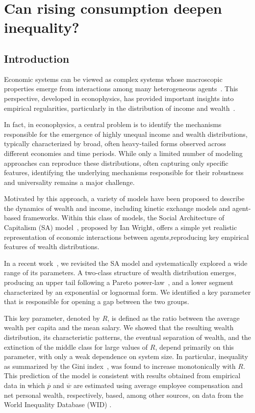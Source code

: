 %

\section{Can rising consumption deepen inequality?}

\subsection{Introduction}

\label{sec:introduction}

 Economic systems can be viewed as complex systems whose macroscopic properties emerge from interactions among many heterogeneous agents~\cite{JUSUP20221,yakovenko2009,Farmer2009}. This perspective, developed in econophysics, has provided important insights into empirical regularities, particularly in the distribution of income and wealth~\cite{shaikh}.

In fact, in econophysics, a central problem is to identify the mechanisms responsible for the emergence of highly unequal income and wealth distributions, typically characterized by broad, often heavy-tailed forms observed across different economies and time periods. While only a limited number of modeling approaches can reproduce these distributions, often capturing only specific features, identifying the underlying mechanisms responsible for their robustness and universality remains a major challenge.

Motivated by this approach, a variety of models have been proposed to describe the dynamics of wealth and income, including kinetic exchange models and agent-based frameworks. Within this class of models, the Social Architecture of Capitalism (SA) model~\cite{Wright_2005}, proposed by Ian Wright, offers a simple yet realistic representation of economic interactions between agents,reproducing key empirical features of wealth distributions.

In a recent work~\cite{Borba2025}, we revisited the SA model and systematically explored a wide range of its parameters. A two-class structure of wealth distribution emerges, producing an upper tail following a Pareto power-law~\cite{dragulescu2001,yakovenko2023}, and a lower segment characterized by an exponential or lognormal form. We identified a key parameter that is responsible for opening a gap between the two groups. 

This key parameter, denoted by $R$, is defined as the ratio between the average wealth per capita and the mean salary. We showed that the resulting wealth distribution, its characteristic patterns, the eventual separation of wealth, and the extinction of the middle class for large values of $R$, depend primarily on this parameter, with only a weak dependence on system size. In particular, inequality as summarized by the Gini index~\cite{PLATAPEREZ201579}, was found to increase monotonically with $R$. This prediction of the model is consistent with results obtained from empirical data in which $\overline{p}$ and $\overline{w}$ are estimated using average employee compensation and net personal wealth, respectively, based, among other sources, on data from the World Inequality Database (WID) \cite{WID}.

